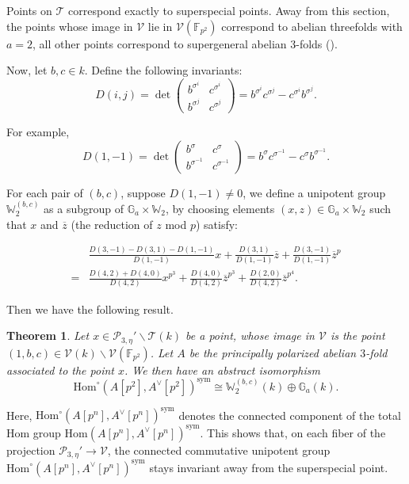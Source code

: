 \documentclass[a4paper,12pt,twoside]{report}
\newtheorem{theorem}{Theorem}[section]
\newcommand{\F}{\mathbb{F}}
\newcommand{\G}{\mathbb{G}}
\newcommand{\Hom}{\mathrm{Hom}}
\newcommand{\W}{\mathbb{W}}
\newcommand{\sym}{\mathrm{sym}}
\newcommand{\PP}{\mathcal{P}}
\begin{document}
Points on $\mathcal{T}$ correspond exactly to superspecial points. Away from this section, 
the points whose image in $\mathcal{V}$ lie in $\mathcal{V}(\F_{p^2})$ correspond to 
abelian threefolds with $a=2$, 
all other points correspond to supergeneral abelian $3$-folds (\cite[Example 9.4]{LiOo}). 

Now, let $b,c\in k$. Define the following invariants: 
\[D(i,j)=\det\left(\begin{matrix}
    b^{\sigma^i}&c^{\sigma^i}\\
    b^{\sigma^{j}}&c^{\sigma^{j}}
\end{matrix}\right)=b^{\sigma^i}c^{\sigma^{j}}-c^{\sigma^i}b^{\sigma^{j}}.\]

For example, 
\[D(1,-1)=\det\left(\begin{matrix}
    b^{\sigma}&c^\sigma\\
    b^{\sigma^{-1}}&c^{\sigma^{-1}}
\end{matrix}\right)=b^{\sigma}c^{\sigma^{-1}}-c^{\sigma}b^{\sigma^{-1}}.\]

For each pair of $(b,c)$, suppose $D(1,-1)\neq 0$, we define a unipotent group $\W_2^{(b,c)}$ as a subgroup of $\G_a\times \W_2$, 
by choosing elements $(x,z)\in \G_a\times \W_2$ 
such that $x$ and $\overline{z}$ (the reduction of $z$ mod $p$) satisfy: 

\[\begin{aligned}
    &\frac{D(3,-1)-D(3,1)-D(1,-1)}{D(1,-1)}x+\frac{D(3,1)}{D(1,-1)}\overline{z}+\frac{D(3,-1)}{D(1,-1)}\overline{z}^p\\
    =&\frac{D(4,2)+D(4,0)}{D(4,2)}x^{p^3}+\frac{D(4,0)}{D(4,2)}\overline{z}^{p^3}+\frac{D(2,0)}{D(4,2)} \overline{z}^{p^4}.
\end{aligned}
\]

Then we have the following result. 

\begin{theorem}\label{distribution}
    Let $x\in \PP_{3,\eta}'\backslash \mathcal{T}(k)$ be a point, 
    whose image in $\mathcal{V}$ is the point $(1,b,c)\in \mathcal{V}(k)\backslash \mathcal{V}(\F_{p^2})$. 
    Let $A$ be the principally polarized abelian $3$-fold associated to the point $x$. 
    We then have an abstract isomorphism
    \[\Hom^{\circ}(A[p^2],A^\vee[p^2])^{\sym}\cong \W_2^{(b,c)}(k)\oplus \G_a(k).\]
\end{theorem}

Here, $\Hom^{\circ}(A[p^n],A^\vee[p^n])^{\sym}$ denotes 
the connected component of the total Hom group 
$\Hom(A[p^n],A^\vee[p^n])^{\sym}$. 
This shows that, on each fiber of the projection $\PP_{3,\eta}'\rightarrow \mathcal{V}$, 
the connected commutative unipotent group $\Hom^{\circ}(A[p^n],A^\vee[p^n])^{\sym}$ stays invariant
away from the superspecial point. 
\end{document}
